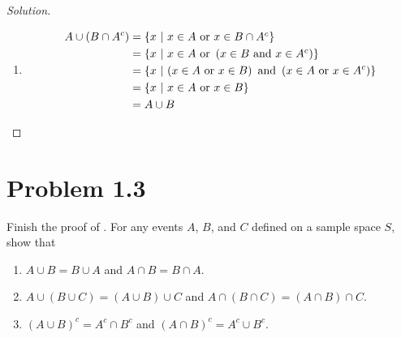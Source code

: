 \documentclass[12pt,letterpaper,reqno]{amsart}
\numberwithin{equation}{subsection}
\begin{document}
\begin{proof}[Solution]
\begin{enumerate}[label = (\alph*), leftmargin=*]
    \item
    
    \begin{align*}
        A \cup (B \cap A^c) &= \SET{x}{\mbox{$x \in A$ or $x \in B \cap A^c$}} \\
                            &= \SET{x}{x \in A \ \mbox{or} \ \left(\mbox{$x \in B$ and $x \in A^c$} \right)} \\
                            &= \SET{x}{\left( x \in A \ \mbox{or} \ x \in B \right) \ \mbox{and} \ \left( x \in A \ \mbox{or} \ x \in A^c \right)} \\
                            &= \SET{x}{\mbox{$x \in A$ or $x \in B$}} \\
                            &= A \cup B
    \end{align*}
\end{enumerate}
\end{proof}

\newpage
\section{Problem 1.3}

Finish the proof of \cite[Theorem 1.1.4 on page 3]{Berger-Casella}. For any events $A$, $B$, and $C$ defined on a sample space $S$, show that

\begin{enumerate}[label= (\alph*), leftmargin=*]
    \item $A \cup B = B \cup A$ and $A \cap B = B \cap A$.
    \item $A \cup (B \cup C) = (A \cup B) \cup C$ and $A \cap (B \cap C) = (A \cap B) \cap C$.
    \item $(A \cup B)^c = A^c \cap B^c$ and $(A \cap B)^c = A^c \cup B^c$.
\end{enumerate}~\\
\end{document}
